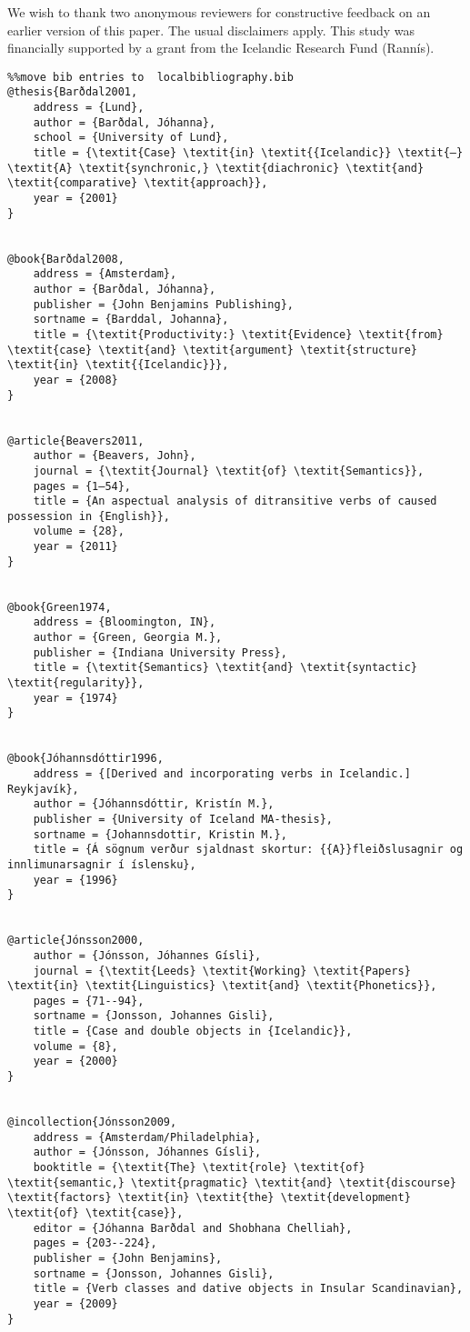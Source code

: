 We wish to thank two anonymous reviewers for constructive feedback on an earlier version of this paper. The usual disclaimers apply. This study was financially supported by a grant from the Icelandic Research Fund (Rannís).
\begin{verbatim}%%move bib entries to  localbibliography.bib
@thesis{Barðdal2001,
	address = {Lund},
	author = {Barðdal, Jóhanna},
	school = {University of Lund},
	title = {\textit{Case} \textit{in} \textit{{Icelandic}} \textit{–} \textit{A} \textit{synchronic,} \textit{diachronic} \textit{and} \textit{comparative} \textit{approach}},
	year = {2001}
}


@book{Barðdal2008,
	address = {Amsterdam},
	author = {Barðdal, Jóhanna},
	publisher = {John Benjamins Publishing},
	sortname = {Barddal, Johanna},
	title = {\textit{Productivity:} \textit{Evidence} \textit{from} \textit{case} \textit{and} \textit{argument} \textit{structure} \textit{in} \textit{{Icelandic}}},
	year = {2008}
}


@article{Beavers2011,
	author = {Beavers, John},
	journal = {\textit{Journal} \textit{of} \textit{Semantics}},
	pages = {1–54},
	title = {An aspectual analysis of ditransitive verbs of caused possession in {English}},
	volume = {28},
	year = {2011}
}


@book{Green1974,
	address = {Bloomington, IN},
	author = {Green, Georgia M.},
	publisher = {Indiana University Press},
	title = {\textit{Semantics} \textit{and} \textit{syntactic} \textit{regularity}},
	year = {1974}
}


@book{Jóhannsdóttir1996,
	address = {[Derived and incorporating verbs in Icelandic.] Reykjavík},
	author = {Jóhannsdóttir, Kristín M.},
	publisher = {University of Iceland MA-thesis},
	sortname = {Johannsdottir, Kristin M.},
	title = {Á sögnum verður sjaldnast skortur: {{A}}fleiðslusagnir og innlimunarsagnir í íslensku},
	year = {1996}
}


@article{Jónsson2000,
	author = {Jónsson, Jóhannes Gísli},
	journal = {\textit{Leeds} \textit{Working} \textit{Papers} \textit{in} \textit{Linguistics} \textit{and} \textit{Phonetics}},
	pages = {71--94},
	sortname = {Jonsson, Johannes Gisli},
	title = {Case and double objects in {Icelandic}},
	volume = {8},
	year = {2000}
}


@incollection{Jónsson2009,
	address = {Amsterdam/Philadelphia},
	author = {Jónsson, Jóhannes Gísli},
	booktitle = {\textit{The} \textit{role} \textit{of} \textit{semantic,} \textit{pragmatic} \textit{and} \textit{discourse} \textit{factors} \textit{in} \textit{the} \textit{development} \textit{of} \textit{case}},
	editor = {Jóhanna Barðdal and Shobhana Chelliah},
	pages = {203--224},
	publisher = {John Benjamins},
	sortname = {Jonsson, Johannes Gisli},
	title = {Verb classes and dative objects in Insular Scandinavian},
	year = {2009}
}



\end{verbatim}
